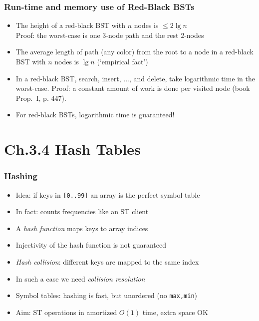 \documentclass[handout]{beamer}
\newcommand{\git}{https://github.com/marcbezem/INF102/blob/master}
\begin{document}
\begin{frame}
    \frametitle{Run-time and memory use of Red-Black BSTs}

\begin{itemize}[<+->]
\item The height of a red-black BST with $n$ nodes is $\leq 2\lg n$\\
Proof: the worst-case is one 3-node path and the rest 2-nodes
\item The average length of path  (any color) from the root to a {node}
in a red-black BST with $n$ nodes is $\lg n$ (`empirical fact')
\item In a red-black BST, search, insert, ..., and delete, take logarithmic time
in the worst-case. Proof: a constant amount of work is done per visited node
(book Prop.\ I, p. 447).
\item For red-black BSTs, logarithmic time is guaranteed!
\end{itemize}
\end{frame}

\section{Ch.3.4 Hash Tables}

\begin{frame}
    \frametitle{Hashing}

\begin{itemize}[<+->]
\item Idea: if keys in {\tt [0..99]} an array is the perfect symbol table
\item In fact:
\href{\git/programs/sorting/elementarySorts/CountSort99.java}%
{\color{red}{CountSort99.java}} counts frequencies like an ST client
\item A \emph{hash function} maps keys to array indices
\item Injectivity of the hash function is not guaranteed
\item \emph{Hash collision}: different keys are mapped to the same index
\item In such a case we need \emph{collision resolution}
\item Symbol tables: hashing is fast, but unordered (no {\tt max,min})
\item Aim: ST operations in amortized $O(1)$ time, extra space OK
\end{itemize}
\end{frame}
\end{document}
